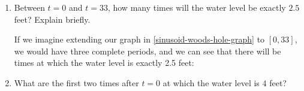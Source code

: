 \documentclass{article}
\begin{document}
\begin{enumerate}
\begin{enumerate}
  
  \item
    \begin{problem}[\vfill]
      Between $t = 0$ and $t = 33$, how many times will the water level be
      exactly $2.5$ feet?  Explain briefly. 
    \end{problem}

    \begin{solution}
      If we imagine extending our graph in \ref{sinusoid-woods-hole-graph}
      to $[0, 33]$, we would have three complete periods, and we can see
      that there will be  times at which the water level is
      exactly 2.5 feet:
      \begin{center}
      \end{center}      
    \end{solution}
    \newpage
\item
    \begin{problem}[\vfill]
      What are the first two times after $t = 0$ at which the water level
      is $4$ feet?
    \end{problem}


\end{enumerate}
\end{enumerate}
\end{document}
